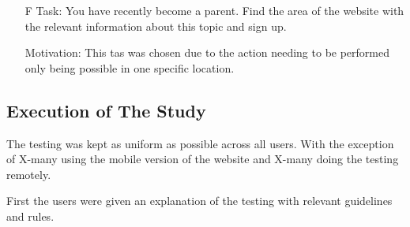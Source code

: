 \begin{itemize}
    \item[F] Task: You have recently become a parent. 
    Find the area of the website with the relevant information about this topic and sign up.
    \item[] Motivation: This tas was chosen due to the action needing to be performed only being possible in one specific location. 
    
\end{itemize}

\subsection{Execution of The Study}

The testing was kept as uniform as possible across all users. With the exception of X-many using the mobile version of the website and X-many doing the testing remotely. 

First the users were given an explanation of the testing with relevant guidelines and rules.  

